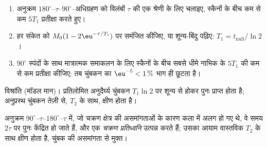 \begin{method}[$T_1$ मापना और मात्रात्मक पुनरावर्तन विलंब निर्धारित करना]\label{met:b3:advanced-nmr:t1}
\begin{enumerate}
  \item अनुक्रम $180^\circ$--$\tau$--$90^\circ$--अधिग्रहण को विलंबों $\tau$ की एक श्रेणी के लिए
        चलाइए, स्कैनों के बीच कम से कम $5T_1$ प्रतीक्षा करते हुए।
  \item हर संकेत को $M_0(1 - 2\eu^{-\tau/T_1})$ पर समंजित कीजिए, या शून्य-बिंदु पढ़िए: $T_1 =
        t_{\mathrm{null}}/\ln2$।
  \item $90^\circ$ स्पंदों के साथ मात्रात्मक समाकलन के लिए स्कैनों के बीच सबसे धीमे नाभिक के
        $5T_1$ की कम से कम प्रतीक्षा कीजिए: तब चुंबकन का $\eu^{-5} < 1\,\%$ भाग ही
        छूटता है।
\end{enumerate}
\end{method}

\begin{omfigure}

{\small विश्रांति (मॉडल मान)। प्रतिलोमित अनुदैर्घ्य चुंबकन
$T_1\ln2$ पर शून्य से होकर पुनः प्राप्त होता है; अनुप्रस्थ चुंबकन
तेज़ी से, $T_2$ के साथ, क्षीण होता है।}
\end{omfigure}

\begin{definition}[चक्रण प्रतिध्वनि]\label{def:b3:advanced-nmr:echo}
अनुक्रम $90^\circ$--$\tau$--$180^\circ$--$\tau$ में, जो चक्रण क्षेत्र की असमांगताओं के कारण कला में
अलग हो गए थे, वे समय $2\tau$ पर पुनः केंद्रित हो जाते हैं, और एक
\emph{चक्रण प्रतिध्वनि} उत्पन्न करते हैं; उसका आयाम वास्तविक $T_2$ के साथ
क्षीण होता है, चुंबक की असमांगता से मुक्त।
\end{definition}


